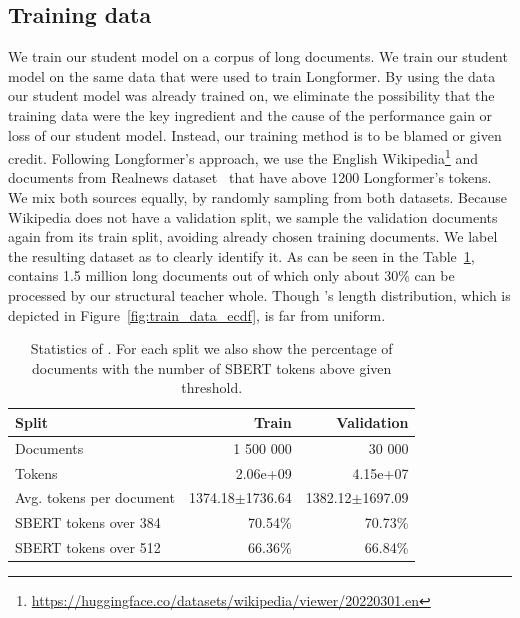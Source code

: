 \subsection{Training data}



We train our student model on a corpus of long documents. We train our student
model on the same data that were used to train Longformer. By using the data our
student model was already trained on, we eliminate the possibility that the
training data were the key ingredient and the cause of the performance gain or
loss of our student model. Instead, our training method is to be blamed or given
credit. Following Longformer's approach, we use the English
Wikipedia\footnote{\url{https://huggingface.co/datasets/wikipedia/viewer/20220301.en}}
and documents from Realnews dataset~\citep{zellers2019defending} that have above
1200 Longformer's tokens. We mix both sources equally, by randomly sampling from
     both datasets. Because Wikipedia does not have a validation split, we
     sample the validation documents again from its train split, avoiding
     already chosen training documents. We label the resulting dataset as
      to clearly identify it. As can be seen in the
     Table~\ref{table:train_data_stats},  contains 1.5
     million long documents out of which only about 30\% can be processed by our
     structural teacher whole. Though 's length
     distribution, which is depicted in Figure~\ref{fig:train_data_ecdf}, is far
     from uniform.

\begin{table}
    \centering
\begin{tabular}{lrr}
\toprule
Split & Train & Validation \\
\midrule
Documents & 1 500 000 & 30 000 \\
Tokens & 2.06e+09 & 4.15e+07 \\
Avg. tokens per document & 1374.18$\pm$1736.64 & 1382.12$\pm$1697.09 \\
SBERT tokens over 384 & 70.54\% & 70.73\% \\
SBERT tokens over 512 & 66.36\% & 66.84\% \\
\bottomrule
\end{tabular}

    \caption{Statistics of . For each split we also show
    the percentage of documents with the number of SBERT tokens above given
    threshold.}

    \label{table:train_data_stats}

\end{table}

